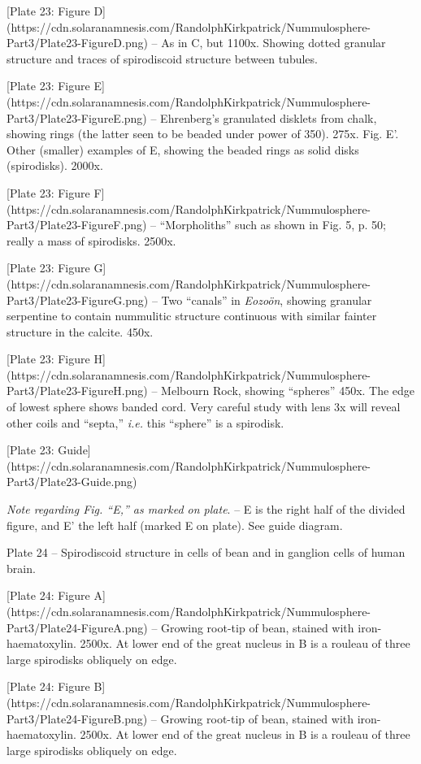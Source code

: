 \documentclass[a4paper, 12pt, oneside]{article}
\begin{document}
[Plate 23: Figure D](https://cdn.solaranamnesis.com/RandolphKirkpatrick/Nummulosphere-Part3/Plate23-FigureD.png) -- As in C, but 1100x. Showing dotted granular structure and traces of spirodiscoid structure between tubules.

[Plate 23: Figure E](https://cdn.solaranamnesis.com/RandolphKirkpatrick/Nummulosphere-Part3/Plate23-FigureE.png) -- Ehrenberg's granulated disklets from chalk, showing rings (the latter seen to be beaded under power of 350). 275x. Fig. E'. Other (smaller) examples of E, showing the beaded rings as solid disks (spirodisks). 2000x.

[Plate 23: Figure F](https://cdn.solaranamnesis.com/RandolphKirkpatrick/Nummulosphere-Part3/Plate23-FigureF.png) -- ``Morpholiths'' such as shown in Fig. 5, p. 50; really a mass of spirodisks. 2500x.

[Plate 23: Figure G](https://cdn.solaranamnesis.com/RandolphKirkpatrick/Nummulosphere-Part3/Plate23-FigureG.png) -- Two ``canals'' in \emph{Eozoön}, showing granular serpentine to contain nummulitic structure continuous with similar fainter structure in the calcite. 450x.

[Plate 23: Figure H](https://cdn.solaranamnesis.com/RandolphKirkpatrick/Nummulosphere-Part3/Plate23-FigureH.png) -- Melbourn Rock, showing ``spheres'' 450x. The edge of lowest sphere shows banded cord. Very careful study with lens 3x will reveal other coils and ``septa,'' \emph{i.e.} this ``sphere'' is a spirodisk.

[Plate 23: Guide](https://cdn.solaranamnesis.com/RandolphKirkpatrick/Nummulosphere-Part3/Plate23-Guide.png)

\emph{Note regarding Fig. ``E,'' as marked on plate}. -- E is the right half of the divided figure, and E' the left half (marked E on plate). See guide diagram.

Plate 24 -- Spirodiscoid structure in cells of bean and in ganglion cells of human brain.

[Plate 24: Figure A](https://cdn.solaranamnesis.com/RandolphKirkpatrick/Nummulosphere-Part3/Plate24-FigureA.png) -- Growing root-tip of bean, stained with iron-haematoxylin. 2500x. At lower end of the great nucleus in B is a rouleau of three large spirodisks obliquely on edge.

[Plate 24: Figure B](https://cdn.solaranamnesis.com/RandolphKirkpatrick/Nummulosphere-Part3/Plate24-FigureB.png) -- Growing root-tip of bean, stained with iron-haematoxylin. 2500x. At lower end of the great nucleus in B is a rouleau of three large spirodisks obliquely on edge.
\end{document}
